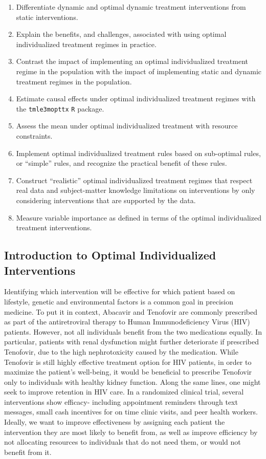 \documentclass[12pt, krantz2,]{krantz}
\providecommand{\tightlist}{%
  \setlength{\itemsep}{0pt}\setlength{\parskip}{0pt}}
\theoremstyle{definition}
\theoremstyle{definition}
\theoremstyle{definition}
\newcommand{\1}{\mathbbm{1}}
\begin{document}
\begin{enumerate}
\def\labelenumi{\arabic{enumi}.}
\tightlist
\item
  Differentiate dynamic and optimal dynamic treatment interventions from static
  interventions.
\item
  Explain the benefits, and challenges, associated with using optimal
  individualized treatment regimes in practice.
\item
  Contrast the impact of implementing an optimal individualized treatment
  regime in the population with the impact of implementing static and dynamic
  treatment regimes in the population.
\item
  Estimate causal effects under optimal individualized treatment regimes with
  the \texttt{tmle3mopttx} \texttt{R} package.
\item
  Assess the mean under optimal individualized treatment with resource
  constraints.
\item
  Implement optimal individualized treatment rules based on sub-optimal
  rules, or ``simple'' rules, and recognize the practical benefit of these rules.
\item
  Construct ``realistic'' optimal individualized treatment regimes that respect
  real data and subject-matter knowledge limitations on interventions by
  only considering interventions that are supported by the data.
\item
  Measure variable importance as defined in terms of the optimal individualized
  treatment interventions.
\end{enumerate}

\hypertarget{introduction-to-optimal-individualized-interventions}{%
\subsection{Introduction to Optimal Individualized Interventions}\label{introduction-to-optimal-individualized-interventions}}

Identifying which intervention will be effective for which patient based on
lifestyle, genetic and environmental factors is a common goal in precision
medicine. To put it in context, Abacavir and Tenofovir are commonly prescribed
as part of the antiretroviral therapy to Human Immunodeficiency Virus (HIV)
patients. However, not all individuals benefit from the two medications equally.
In particular, patients with renal dysfunction might further deteriorate if
prescribed Tenofovir, due to the high nephrotoxicity caused by the medication.
While Tenofovir is still highly effective treatment option for HIV patients, in
order to maximize the patient's well-being, it would be beneficial to prescribe
Tenofovir only to individuals with healthy kidney function. Along the same
lines, one might seek to improve retention in HIV care. In a randomized clinical
trial, several interventions show efficacy- including appointment reminders
through text messages, small cash incentives for on time clinic visits, and peer
health workers. Ideally, we want to improve effectiveness by assigning each
patient the intervention they are most likely to benefit from, as well as
improve efficiency by not allocating resources to individuals that do not need
them, or would not benefit from it.
\end{document}
